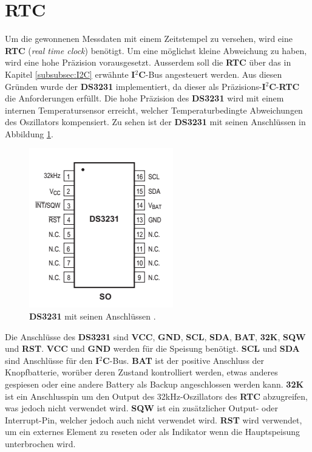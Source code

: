\section{RTC}
\label{chap:RTC}
Um die gewonnenen Messdaten mit einem Zeitstempel zu versehen, wird eine \textbf{RTC} (\textit{real time clock}) benötigt. Um eine möglichst kleine Abweichung zu haben, wird eine hohe Präzision vorausgesetzt. Ausserdem soll die \textbf{RTC} über das in Kapitel \ref{subsubsec:I2C} erwähnte \textbf{I$^2$C}-Bus angesteuert werden. Aus diesen Gründen wurde der \textbf{DS3231} implementiert, da dieser als Präzisions-\textbf{I$^2$C}-\textbf{RTC} die Anforderungen erfüllt. Die hohe Präzision des \textbf{DS3231} wird mit einem internen Temperatursensor erreicht, welcher Temperaturbedingte Abweichungen des Oszillators kompensiert. Zu sehen ist der \textbf{DS3231} mit seinen Anschlüssen in Abbildung \ref{fig:DS3231}.

\begin{figure}[h]
\centering
\includegraphics[width=0.4\linewidth]{graphics/DS3231.png}
\caption{\textbf{DS3231} mit seinen Anschlüssen \cite{DS3231DS}.}
\label{fig:DS3231}
\end{figure}

Die Anschlüsse des \textbf{DS3231} sind \textbf{VCC}, \textbf{GND}, \textbf{SCL}, \textbf{SDA}, \textbf{BAT}, \textbf{32K}, \textbf{SQW} und \textbf{RST}. \textbf{VCC} und \textbf{GND} werden für die Speisung benötigt. \textbf{SCL} und \textbf{SDA} sind Anschlüsse für den \textbf{I$^2$C}-Bus. \textbf{BAT} ist der positive Anschluss der Knopfbatterie, worüber deren Zustand kontrolliert werden, etwas anderes gespiesen oder eine andere Battery als Backup angeschlossen werden kann. \textbf{32K} ist ein Anschlusspin um den Output des 32kHz-Oszillators des \textbf{RTC} abzugreifen, was jedoch nicht verwendet wird. \textbf{SQW} ist ein zusätzlicher Output- oder Interrupt-Pin, welcher jedoch auch nicht verwendet wird. \textbf{RST} wird verwendet, um ein externes Element zu reseten oder als Indikator wenn die Hauptspeisung unterbrochen wird. \cite{DS3231DS}\\

